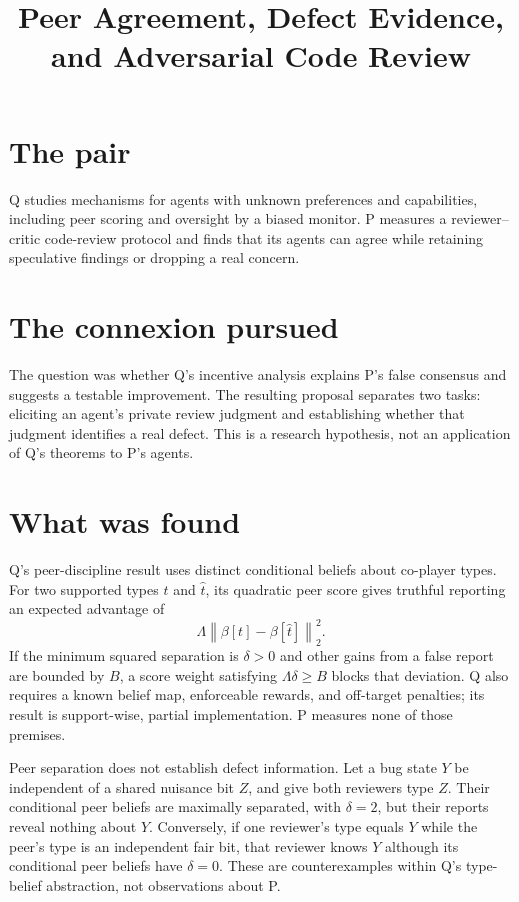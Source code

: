 \documentclass{article}
\title{Peer Agreement, Defect Evidence, and Adversarial Code Review}
\begin{document}
\maketitle

\section*{The pair}

Q studies mechanisms for agents with unknown preferences and capabilities, including peer scoring and oversight by a biased monitor. P measures a reviewer--critic code-review protocol and finds that its agents can agree while retaining speculative findings or dropping a real concern. 

\section*{The connexion pursued}

The question was whether Q's incentive analysis explains P's false consensus and suggests a testable improvement. The resulting proposal separates two tasks: eliciting an agent's private review judgment and establishing whether that judgment identifies a real defect. This is a research hypothesis, not an application of Q's theorems to P's agents. 

\section*{What was found}

Q's peer-discipline result uses distinct conditional beliefs about co-player types. For two supported types \(t\) and \(\hat t\), its quadratic peer score gives truthful reporting an expected advantage of
\[
\Lambda\left\lVert\beta[t]-\beta[\hat t]\right\rVert_2^2.
\]
If the minimum squared separation is \(\delta>0\) and other gains from a false report are bounded by \(B\), a score weight satisfying \(\Lambda\delta\geq B\) blocks that deviation. Q also requires a known belief map, enforceable rewards, and off-target penalties; its result is support-wise, partial implementation. P measures none of those premises. 

Peer separation does not establish defect information. Let a bug state \(Y\) be independent of a shared nuisance bit \(Z\), and give both reviewers type \(Z\). Their conditional peer beliefs are maximally separated, with \(\delta=2\), but their reports reveal nothing about \(Y\). Conversely, if one reviewer's type equals \(Y\) while the peer's type is an independent fair bit, that reviewer knows \(Y\) although its conditional peer beliefs have \(\delta=0\). These are counterexamples within Q's type-belief abstraction, not observations about P. 
\end{document}
